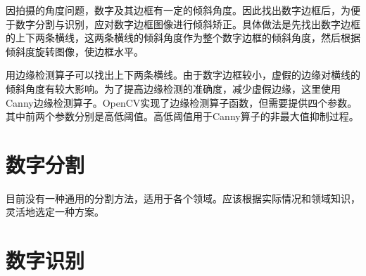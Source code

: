 因拍摄的角度问题，数字及其边框有一定的倾斜角度。因此找出数字边框后，为便于数字分割与识别，应对数字边框图像进行倾斜矫正。具体做法是先找出数字边框的上下两条横线，这两条横线的倾斜角度作为整个数字边框的倾斜角度，然后根据倾斜度旋转图像，使边框水平。

用边缘检测算子可以找出上下两条横线。由于数字边框较小，虚假的边缘对横线的倾斜角度有较大影响。为了提高边缘检测的准确度，减少虚假边缘，这里使用Canny边缘检测算子。OpenCV实现了边缘检测算子函数，但需要提供四个参数。其中前两个参数分别是高低阈值。高低阈值用于Canny算子的非最大值抑制过程。

\section{数字分割}

目前没有一种通用的分割方法，适用于各个领域。应该根据实际情况和领域知识，灵活地选定一种方案。

\section{数字识别}



